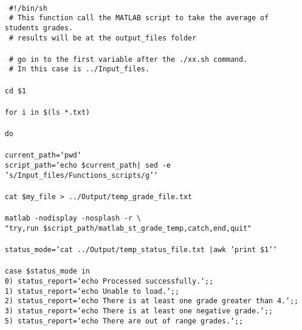 \begin{mdframed}[hidealllines=true,backgroundcolor=gray!20]
\begin{singlespace}
\fontsize{10pt}{1pt}
\texttt{
\\
{ \color{matlab_green} \#!/bin/sh}\\
{ \color{matlab_green} \# This function call the MATLAB script to take the average of students grades.}\\
{ \color{matlab_green} \# results will be at the output\_files folder}\\
\\
{ \color{matlab_green} \# go in to the first variable after the ./xx.sh command.}\\
{ \color{matlab_green} \# In this case is ../Input\_files.}\\
\\
cd \$1\\
\\
{\color{for_pink}for} i {\color{for_pink}in} \$(ls *.txt)\\
\\
{\color{for_pink}do}\\
\\
current\_path={\color{red}`pwd`}\\
script\_path={\color{red}`echo \$current\_path| sed -e 's/Input\_files/Functions\_scripts/g'`}\\
\\
cat \$my\_file > ../Output/temp\_grade\_file.txt\\
\\
matlab -nodisplay -nosplash -r   \textbackslash \\
{\color{red}"try,run \$script\_path/matlab\_st\_grade\_temp,catch,end,quit"}\\
\\
status\_mode={\color{red}`cat ../Output/temp\_status\_file.txt |awk '{print \$1}'`}\\
\\
{\color{for_pink}case} \$status\_mode {\color{for_pink}in}\\
0) status\_report={\color{red}`echo Processed successfully.`};;\\
1) status\_report={\color{red}`echo Unable to load.`};;\\
2) status\_report={\color{red}`echo There is at least one grade greater than 4.`};;\\
3) status\_report={\color{red}`echo There is at least one negative grade.`};;\\
5) status\_report={\color{red}`echo There are out of range grades.`};;\\
}
\end{singlespace}
\end{mdframed}
